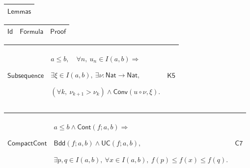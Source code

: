 \documentclass[11pt]{amsart}
\renewcommand{\arraystretch}{1.4}
\newlength{\FTCOneColumnBody}
\newlength{\FTCThreeColumnBody}
\begin{document}
{\centering
\renewcommand{\arraystretch}{1.4}
\par\setlength{\parskip}{0pt}\nointerlineskip
\noindent
\begin{tabular}{|@{}>{\centering\arraybackslash}m{\FTCOneColumnBody}|}\hline
$\displaystyle \textsf{Lemmas}$\\ \hline
\end{tabular}%
\par\setlength{\parskip}{0pt}\nointerlineskip
\noindent
\begin{tabular}{|@{}>{\centering\arraybackslash}m{0.251968\FTCThreeColumnBody}|>{\centering\arraybackslash}m{0.590551\FTCThreeColumnBody}|>{\centering\arraybackslash}m{0.157480\FTCThreeColumnBody}|}\hline
$\displaystyle \textsf{Id}$ & $\displaystyle \textsf{Formula}$ & $\displaystyle \textsf{Proof}$\\ \hline
\end{tabular}%
\par\setlength{\parskip}{0pt}\nointerlineskip
\noindent
\begin{tabular}{|@{}>{\centering\arraybackslash}m{0.251968\FTCThreeColumnBody}|>{\centering\arraybackslash}m{0.590551\FTCThreeColumnBody}|>{\centering\arraybackslash}m{0.157480\FTCThreeColumnBody}|}\hline
\hypertarget{lem:Subsequence}{$\displaystyle \textsf{Subsequence}$} & $\displaystyle a\le b,\quad\forall n,\ u_n\in I(a,b)\Rightarrow$\par
$\displaystyle \exists\xi\in I(a,b),\ \exists\nu:\textsf{Nat}\to\textsf{Nat},$\par
$\displaystyle (\forall k,\ \nu_{k+1}>\nu_k)\land\textsf{Conv}(u\circ\nu,\xi).$ & \hyperlink{proof:K5}{$\displaystyle \textsf{K5}$}\\ \hline
\end{tabular}%
\par\setlength{\parskip}{0pt}\nointerlineskip
\noindent
\begin{tabular}{|@{}>{\centering\arraybackslash}m{0.251968\FTCThreeColumnBody}|>{\centering\arraybackslash}m{0.590551\FTCThreeColumnBody}|>{\centering\arraybackslash}m{0.157480\FTCThreeColumnBody}|}\hline
\hypertarget{lem:CompactCont}{$\displaystyle \textsf{CompactCont}$} & $\displaystyle a\le b\land\textsf{Cont}(f;a,b)\Rightarrow$\par
$\displaystyle \textsf{Bdd}(f;a,b)\land\textsf{UC}(f;a,b),$\par
$\displaystyle \exists p,q\in I(a,b),\ \forall x\in I(a,b),\ f(p)\le f(x)\le f(q).$ & \hyperlink{proof:C7}{$\displaystyle \textsf{C7}$}\\ \hline

\end{tabular}}
\end{document}
